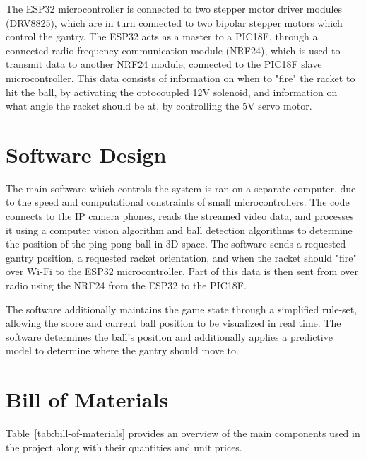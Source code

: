 The ESP32 microcontroller is connected to two stepper motor driver modules (DRV8825), which are in turn connected to two bipolar stepper motors which control the gantry. The ESP32 acts as a master to a PIC18F, through a connected radio frequency communication module (NRF24), which is used to transmit data to another NRF24 module, connected to the PIC18F slave microcontroller. This data consists of information on when to "fire" the racket to hit the ball, by activating the optocoupled 12V solenoid, and information on what angle the racket should be at, by controlling the 5V servo motor.

\section{Software Design}
The main software which controls the system is ran on a separate computer, due to the speed and computational constraints of small microcontrollers. The code connects to the IP camera phones, reads the streamed video data, and processes it using a computer vision algorithm and ball detection algorithms to determine the position of the ping pong ball in 3D space. The software sends a requested gantry position, a requested racket orientation, and when the racket should "fire" over Wi-Fi to the ESP32 microcontroller. Part of this data is then sent from over radio using the NRF24 from the ESP32 to the PIC18F.

The software additionally maintains the game state through a simplified rule-set, allowing the score and current ball position to be visualized in real time. The software determines the ball's position and additionally applies a predictive model to determine where the gantry should move to.


\section{Bill of Materials}

Table~\ref{tab:bill-of-materials} provides an overview of the main components used in the project along with their quantities and unit prices.

